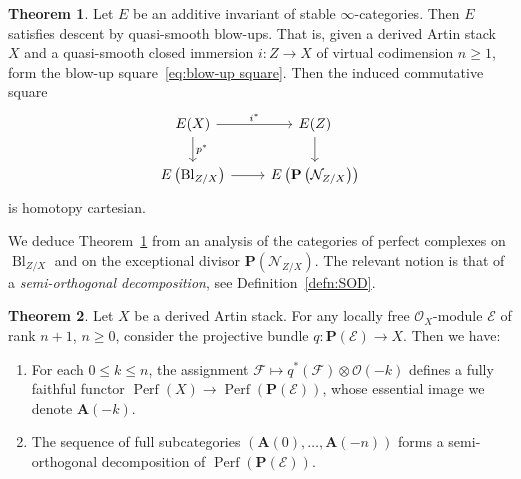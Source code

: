\documentclass[11pt]{article}
\theoremstyle{definition}
\numberwithin{equation}{section}
\numberwithin{figure}{section}
\numberwithin{table}{section}
\newtheorem{thmX}{Theorem}
\newcommand{\sE}{\ensuremath{\mathcal{E}}\xspace}
\newcommand{\sF}{\ensuremath{\mathcal{F}}\xspace}
\newcommand{\sN}{\ensuremath{\mathcal{N}}\xspace}
\newcommand{\sO}{\ensuremath{\mathcal{O}}\xspace}
\newcommand{\bA}{\ensuremath{\mathbf{A}}\xspace}
\newcommand{\bP}{\ensuremath{\mathbf{P}}\xspace}
\renewcommand{\ge}{\geqslant}
\renewcommand{\le}{\leqslant}
\renewcommand{\P}{\bP}
\DeclareMathOperator{\Perf}{Perf}
\DeclareMathOperator{\Bl}{Bl}
\newcommand*{\romanenumi}{\renewcommand*{\theenumi}{\roman{enumi}}}
\begin{document}
\begingroup
\begin{thmX}\label{thm:blow-up descent}
Let $E$ be an additive invariant of stable $\infty$-categories. Then $E$ satisfies descent by quasi-smooth blow-ups. That is, given a derived Artin stack $X$ and a quasi-smooth closed immersion $i : Z \to X$ of virtual codimension $n\ge 1$, form the blow-up square~\eqref{eq:blow-up square}. Then the induced commutative square
\[
\begin{tikzcd}
E(X) \ar{r}{i^*}\ar{d}{p^*} & E(Z) \ar{d}
\\
E\left(\Bl_{Z/X}\right) \ar{r} & E\left(\P\left(\sN_{Z/X}\right)\right)
\end{tikzcd}
\]
is homotopy cartesian.
\end{thmX}
\endgroup

We deduce Theorem~\ref{thm:blow-up descent} from an analysis of the categories of perfect complexes on $\Bl_{Z/X}$ and on the exceptional divisor $\P(\sN_{Z/X})$. The relevant notion is that of a \emph{semi-orthogonal decomposition}, see
Definition~\ref{defn:SOD}.

\begin{thmX}\label{thm:Perf(P(E))}
Let $X$ be a derived Artin stack. For any locally free $\sO_X$-module $\sE$ of rank $n+1$, $n\ge 0$, consider the projective bundle $q : \P(\sE) \to X$. Then we have:
\begin{enumerate}\romanenumi
\item\label{item:Perf(P(E))/fully faithful}
For each $0\le k\le n$, the assignment $\sF \mapsto q^*(\sF) \otimes \sO(-k)$ defines a fully faithful functor $\Perf(X) \to \Perf(\P(\sE))$, whose essential image we denote $\bA(-k)$.

\item\label{item:Perf(P(E))/SOD}
The sequence of full subcategories $(\bA(0),\ldots,\bA(-n))$ forms a semi-orthogonal decomposition of $\Perf(\P(\sE))$.
\end{enumerate}
\end{thmX}
\end{document}
